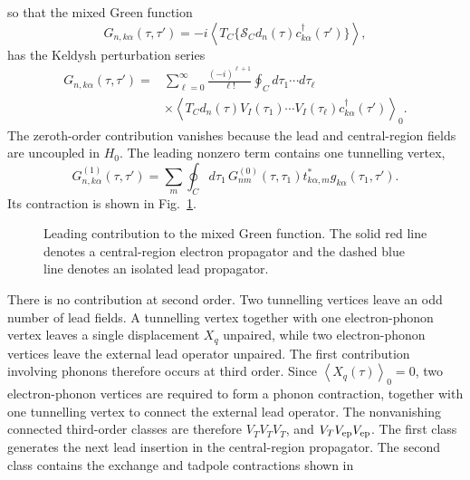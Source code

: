 \documentclass[
 reprint,
 superscriptaddress,
 amsmath,amssymb,
 aps,prb,
 longbibliography,
 floatfix
]{revtex4-2}
\begin{document}
so that the mixed Green function
\begin{equation*}
G_{n,k\alpha}(\tau,\tau')
=
-i
\left\langle
T_C\{\mathcal S_C
d_n(\tau)c_{k\alpha}^{\dagger}(\tau')
\}\right\rangle,
\end{equation*}
has the Keldysh perturbation series
\begin{align*}
G_{n,k\alpha}(\tau,\tau')
={}&
\sum_{\ell=0}^{\infty}
\frac{(-i)^{\ell+1}}{\ell!}
\oint_C d\tau_1\cdots d\tau_\ell
\\
&\times
\left\langle
T_C
d_n(\tau)
V_I(\tau_1)\cdots V_I(\tau_\ell)
c_{k\alpha}^{\dagger}(\tau')
\right\rangle_0 .
\end{align*}
The zeroth-order contribution vanishes because the lead and central-region fields are uncoupled in \(H_0\). The leading nonzero term contains one tunnelling vertex,
\begin{equation*}
G_{n,k\alpha}^{(1)}(\tau,\tau')
=
\sum_m
\oint_C d\tau_1\,
G_{nm}^{(0)}(\tau,\tau_1)
t_{k\alpha,m}^{*}
g_{k\alpha}(\tau_1,\tau').
\end{equation*}
Its contraction is shown in Fig.~\ref{fig:mixed-leading}.
\begin{figure}[ht]
\centering
{}
\caption{
Leading contribution to the mixed Green function. The solid red line denotes a central-region electron propagator and the dashed blue line denotes an isolated lead propagator.}
\label{fig:mixed-leading}
\end{figure}
There is no contribution at second order. Two tunnelling vertices leave an odd number of lead fields. A tunnelling vertex together with one electron-phonon vertex leaves a single displacement \(X_q\) unpaired, while two electron-phonon vertices leave the external lead operator unpaired. The first contribution involving phonons therefore occurs at third order. Since $\left\langle X_q(\tau)\right\rangle_0=0$, two electron-phonon vertices are required to form a phonon contraction, together with one tunnelling vertex to connect the external lead operator. The nonvanishing connected third-order classes are therefore $V_TV_TV_T$, and $V_TV_{\rm ep}V_{\rm ep}$. The first class generates the next lead insertion in the central-region propagator. The second class contains the exchange and tadpole contractions shown in
\end{document}

